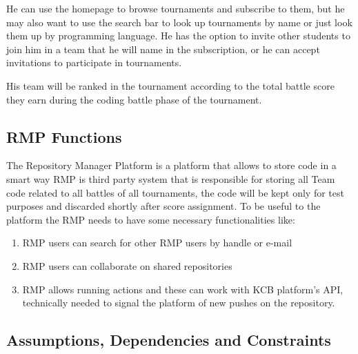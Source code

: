 He can use the homepage to browse tournaments and subscribe to them, but he may also want to use the search bar to look up tournaments by name or just look them up by programming language. He has the option to invite other students
to join him in a team that he will name in the subscription, or he can accept invitations to participate in tournaments.

His team will be ranked in the tournament according to the total battle score they earn during the coding battle phase of the tournament.

\subsection{RMP Functions}
The Repository Manager Platform is a platform that allows to store code in a smart way
RMP is third party system that is responsible for storing all Team code related to all battles of all tournaments, the code will be kept only for test purposes and discarded shortly after score assignment. 
To be useful to the platform the RMP needs to have some necessary functionalities like:
\begin{enumerate}
    \item RMP users can search for other RMP users by handle or e-mail
    \item RMP users can collaborate on shared repositories
    \item RMP allows running actions and these can work with KCB platform's API, technically needed to signal the platform of new pushes on the repository.
\end{enumerate}


\subsection{Assumptions, Dependencies and Constraints}

